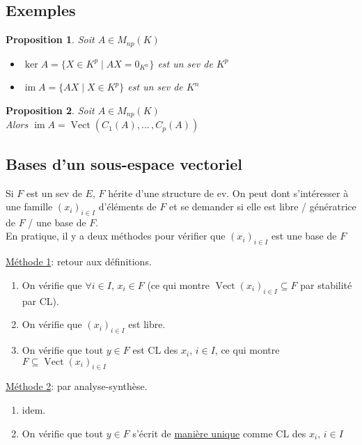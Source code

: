 \documentclass[10pt,a4paper]{article}
\theoremstyle{plain}
\newtheorem{proposition}{Proposition}[section]
\theoremstyle{definition}
\DeclareMathOperator{\vect}{Vect}
\DeclareMathOperator{\im}{im}
\begin{document}
\subsection{Exemples}
\begin{proposition}
Soit $A \in M_{np}(K)$
\begin{itemize}
\item $\ker A = \{ X \in K^p \mid AX = 0_{K^n} \}$ est un sev de $K^p$
\item $\im A = \{ AX \mid X \in K^p \}$ est un sev de $K^n$
\end{itemize}
\end{proposition}
\begin{proposition}
Soit $A \in M_{np}(K)$ \\
Alors $\im A = \vect(C_1(A), ...\, , C_p(A))$
\end{proposition}

\subsection{Bases d'un sous-espace vectoriel}
Si $F$ est un sev de $E$, $F$ hérite d'une structure de ev. On peut dont s'intéresser à une famille $(x_i)_{i \in I}$ d'éléments de $F$ et se demander si elle est libre / génératrice de $F$ / une base de $F$. \\
En pratique, il y a deux méthodes pour vérifier que $(x_i)_{i \in I}$ est une base de $F$ \vspace{1em}

\uline{Méthode 1}: retour aux définitions.
\begin{enumerate}
\item[0.] On vérifie que $\forall i \in I$, $x_i \in F$ (ce qui montre $\vect(x_i)_{i \in I} \subseteq F$ par stabilité par CL).
\item[1.] On vérifie que $(x_i)_{i \in I}$ est libre.
\item[2.] On vérifie que tout $y \in F$ est CL des $x_i,\, i \in I$, ce qui montre $F \subseteq \vect(x_i)_{i \in I}$
\end{enumerate} \medskip

\uline{Méthode 2}: par analyse-synthèse.
\begin{enumerate}
\item[0.] idem.
\item[1.] On vérifie que tout $y \in F$ s'écrit de \uline{manière unique} comme CL des $x_i,\, i \in I$
\end{enumerate}
\end{document}
